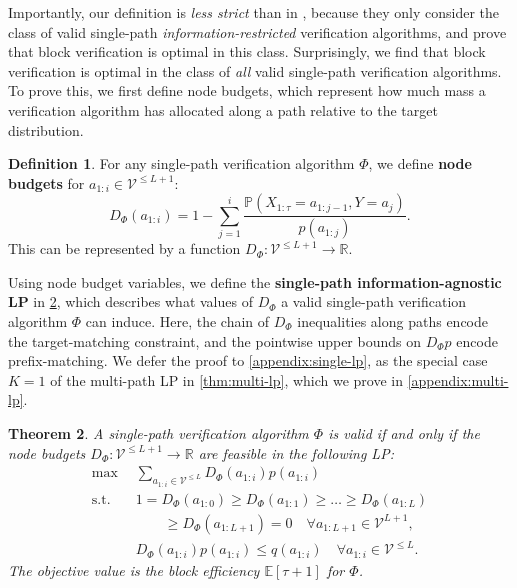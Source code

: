 \documentclass{article}
\theoremstyle{plain}
\newtheorem{theorem}{Theorem}[section]
\theoremstyle{definition}
\newtheorem{definition}[theorem]{Definition}
\theoremstyle{remark}
\newcommand{\V}{\mathcal{V}}
\begin{document}
Importantly, our definition is \emph{less strict} than in \citet{sun2024block}, because they only consider the class of valid single-path \emph{information-restricted} verification algorithms, and prove that block verification is optimal in this class. Surprisingly, we find that block verification is optimal in the class of \emph{all} valid single-path verification algorithms. To prove this, we first define node budgets, which represent how much mass a verification algorithm has allocated along a path relative to the target distribution.
\begin{definition}
    For any single-path verification algorithm $\Phi$, we define \textbf{node budgets} for $a_{1:i} \in \V^{\leq L+1}$:
    \begin{equation}
        D_\Phi(a_{1:i})=1-\sum_{j=1}^{i} \frac{\mathbb{P}(X_{1:\tau}=a_{1:j-1},Y=a_j)}{p(a_{1:j})}.
    \end{equation}
    This can be represented by a function $D_\Phi: \V^{\leq L+1} \to \mathbb{R}$.
    \label{def:node-budgets-sp}
\end{definition}

Using node budget variables, we define the \textbf{single-path information-agnostic LP} in \cref{thm:single-lp}, which describes what values of $D_\Phi$ a valid single-path verification algorithm $\Phi$ can induce. Here, the chain of $D_\Phi$ inequalities along paths encode the target-matching constraint, and the pointwise upper bounds on $D_\Phi p$ encode prefix-matching. We defer the proof to \cref{appendix:single-lp}, as the special case $K=1$ of the multi-path LP in \cref{thm:multi-lp}, which we prove in \cref{appendix:multi-lp}.

\begin{theorem} A single-path verification algorithm $\Phi$ is valid if and only if the node budgets $D_\Phi:\V^{\leq L+1} \to \mathbb{R}$ are \emph{feasible} in the following LP:
\begin{align}
    \max &\sum_{a_{1:i} \in \V^{\leq L}} D_\Phi(a_{1:i}) p(a_{1:i}) \\
    \text{s.t.}\quad& 1=D_\Phi(a_{1:0}) \geq D_\Phi(a_{1:1}) \geq \ldots \geq D_\Phi(a_{1:L}) \\ &\quad \quad \geq D_\Phi(a_{1:L+1})= 0 \quad \forall a_{1:L+1} \in \V^{L+1},\\
    & D_\Phi(a_{1:i})p(a_{1:i}) \leq q(a_{1:i}) \quad \forall a_{1:i} \in \V^{\leq L}.
\end{align}
The objective value is the block efficiency $\mathbb{E}[\tau+1]$ for $\Phi$.
\label{thm:single-lp}
\end{theorem}
\end{document}
